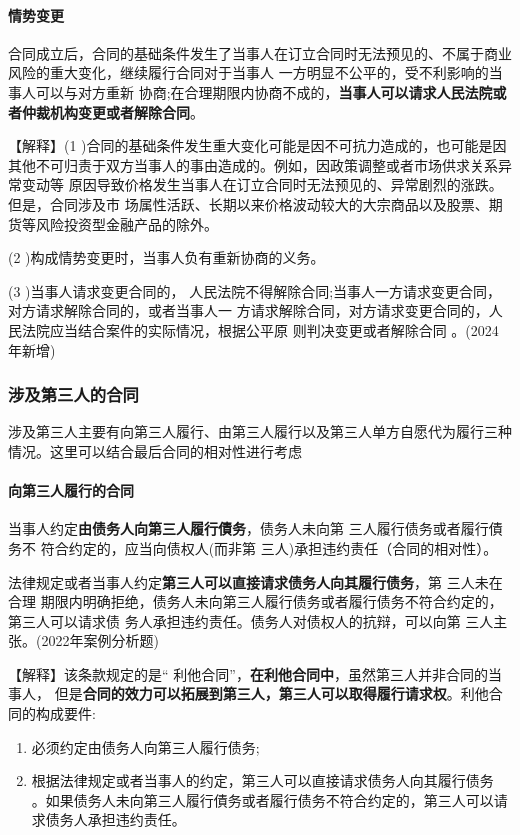 \documentclass[UTF8,12pt]{ctexart}
\numberwithin{equation}{section} %
\numberwithin{figure}{section}
\numberwithin{table}{section}
\begin{document}
	\paragraph{情势变更} 合同成立后，合同的基础条件发生了当事人在订立合同时无法预见的、不属于商业风险的重大变化，继续履行合同对于当事人 一方明显不公平的，受不利影响的当事人可以与对方重新 协商;在合理期限内协商不成的，\textbf{当事人可以请求人民法院或者仲裁机构变更或者解除合同}。
	
	【解释】(1 )合同的基础条件发生重大变化可能是因不可抗力造成的，也可能是因其他不可归责于双方当事人的事由造成的。例如，因政策调整或者市场供求关系异常变动等 原因导致价格发生当事人在订立合同时无法预见的、异常剧烈的涨跌。但是，合同涉及市 场属性活跃、长期以来价格波动较大的大宗商品以及股票、期货等风险投资型金融产品的除外。
	
	(2 )构成情势变更时，当事人负有重新协商的义务。
	
	(3 )当事人请求变更合同的， 人民法院不得解除合同;当事人一方请求变更合同，对方请求解除合同的，或者当事人一 方请求解除合同，对方请求变更合同的，人民法院应当结合案件的实际情况，根据公平原 则判决变更或者解除合同 。(2024年新增)
	
	
	
	\subsubsection{涉及第三人的合同}
	涉及第三人主要有向第三人履行、由第三人履行以及第三人单方自愿代为履行三种情况。这里可以结合最后合同的相对性进行考虑
	
	\paragraph{向第三人履行的合同}
	当事人约定\textbf{由债务人向第三人履行債务}，债务人未向第 三人履行债务或者履行債务不 符合约定的，应当向债权人(而非第 三人)承担违约责任（合同的相对性）。
	
	法律规定或者当事人约定\textbf{第三人可以直接请求债务人向其履行债务}，第 三人未在合理 期限内明确拒绝，债务人未向第三人履行债务或者履行债务不符合约定的，第三人可以请求债 务人承担违约责任。债务人对债权人的抗辩，可以向第 三人主张。(2022年案例分析题)
	
	【解释】该条款规定的是“ 利他合同”，\textbf{在利他合同中}，虽然第三人并非合同的当事人， 但是\textbf{合同的效力可以拓展到第三人，第三人可以取得履行请求权}。利他合同的构成要件:
	\begin{enumerate}
		\item 必须约定由债务人向第三人履行债务;
		
		\item 根据法律规定或者当事人的约定，第三人可以直接请求债务人向其履行债务 。如果债务人未向第三人履行債务或者履行债务不符合约定的，第三人可以请求债务人承担违约责任。
	\end{enumerate} 
	
\end{document}
